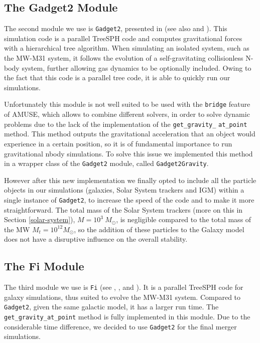 \documentclass[a4paper,12pt, english]{article}
\begin{document}
\subsection{The Gadget2 Module}
\label{gadget2}
The second module we use is \texttt{Gadget2}, presented in \textcite{Springel_2005} (see also \textcite{Springel_2001} and \textcite{Durier_2012}). This simulation code is a parallel TreeSPH code and computes gravitational forces with a hierarchical tree algorithm. When simulating an isolated system, such as the MW-M31 system, it follows the evolution of a self-gravitating collisionless N-body system, further allowing gas dynamics to be optionally included. Owing to the fact that this code is a parallel tree code, it is able to quickly run our simulations.\par
\smallskip
Unfortunately this module is not well suited to be used with the \texttt{bridge} feature of AMUSE, which allows to combine different solvers, in order to solve dynamic problems due to the lack of the implementation of the \texttt{get\_gravity\_} \texttt{at\_point} method. This method outputs the gravitational acceleration that an object would experience in a certain position, so it is of fundamental importance to run gravitational nbody simulations. To solve this issue we implemented this method in a wrapper class of the \texttt{Gadget2} module, called \texttt{Gadget2Gravity}.\par
\smallskip
However after this new implementation we finally opted to include all the particle objects in our simulations (galaxies, Solar System trackers and IGM) within a single instance of \texttt{Gadget2}, to increase the speed of the code and to make it more straightforward. The total mass of the Solar System trackers (more on this in Section \ref{solar-system}), \(M = 10^3\: M_{\odot}\), is negligible compared to the total mass of the MW \(M_t = 10^{12} M_{\odot}\), so the addition of these particles to the Galaxy model does not have a disruptive influence on the overall stability.\par
\smallskip

\subsection{The Fi Module}
\label{fi}
The third module we use is \texttt{Fi} (see \textcite{Hernquist_1989}, \textcite{Gerritsen_1999}, \textcite{Pelupessy_2004} and \textcite{Pelupessy_2005}). It is a parallel TreeSPH code for galaxy simulations, thus suited to evolve the MW-M31 system. Compared to \texttt{Gadget2}, given the same galactic model, it has a larger run time. The \texttt{get\_gravity\_at\_point} method is fully implemented in this module. Due to the considerable time difference, we decided to use \texttt{Gadget2} for the final merger simulations.\par
\smallskip
\end{document}

